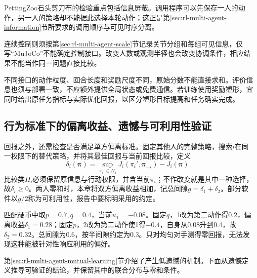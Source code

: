 PettingZoo石头剪刀布的检验重点包括信息屏蔽。调用程序可以先保存一人的动作，另一人的策略却不能据此选择本轮动作；这正是第\ref{sec:rl-multi-agent-information}节所要求的调用顺序与可见时序分离。

连续控制则须按第\ref{sec:rl-multi-agent-scale}节记录关节分组和每组可见信息，仅写“MuJoCo”不能确定控制接口。改变人数或观测半径也会改变协调条件，相应结果不能当作同一问题直接比较。

不同接口的动作粒度、回合长度和奖励尺度不同，原始分数不能直接求和。评价信息也须与部署一致，不应额外提供全局状态或免费通信。若训练使用奖励塑形，宜同时给出原任务指标与实际优化回报，以区分塑形目标提高和任务确实完成。

\subsection{行为标准下的偏离收益、遗憾与可利用性验证}
\label{sec:rl-multi-agent-deviations}

回报之外，还需检查是否满足单方偏离标准。固定其他人的完整策略，搜索$i$在同一权限下的替代策略，并将其最佳回报与当前回报比较，定义
\[
 \delta_i(\bm\pi)=
 \sup_{\pi_i'\in\Pi_i}J_i(\pi_i',\bm\pi_{-i})-J_i(\bm\pi).
\]
比较类$\Pi_i$必须保留原信息与行动权限，并含当前$\pi_i$；不作改变就是其中一种选择，故$\delta_i\geq0$。两人零和时，本章将双方偏离收益相加，记总间隙$g=\delta_1+\delta_2$。部分软件以$g/2$称为可利用性，报告中要标明采用的约定。

匹配硬币中取$p=0.7,q=0.4$，当前$u_1=-0.08$。固定$q$，1改为第二动作得0.2，偏离收益$\delta_1=0.28$；固定$p$，2改为第二动作使1得$-0.4$，自身从0.08升到0.4，故$\delta_2=0.32$。总间隙为0.6，按半间隙约定为0.3。只对均匀对手测得零回报，无法发现这种能被针对性响应利用的偏好。

第\ref{sec:rl-multi-agent-mutual-learning}节介绍了产生低遗憾的机制。下面从遗憾定义推导可验证的结论，并保留其中的联合分布与零和条件。

